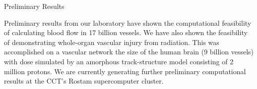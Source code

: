 \begin{center}
Preliminary Results
\end{center}
Preliminary results from our laboratory have shown the computational feasibility of calculating blood flow in 17 billion vessels. We have also shown the feasibility of demonstrating whole-organ vascular injury from radiation. This was accomplished on a vascular network the size of the human brain (9 billion vessels) with dose simulated by an amorphous track-structure model consisting of 2 million protons. We are currently generating further preliminary computational results at the CCT’s Rostam supercomputer cluster. 